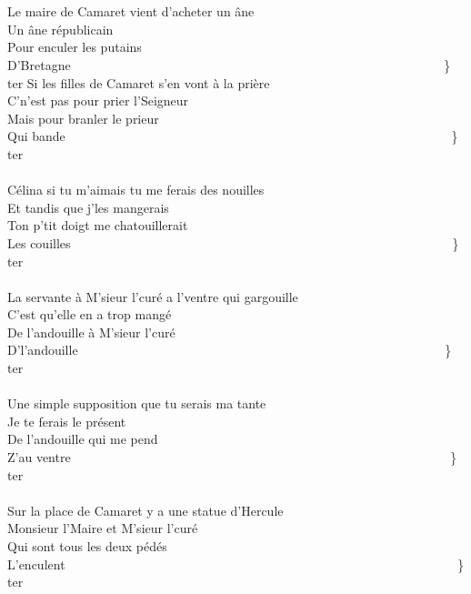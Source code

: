 \\\\Le maire de Camaret vient d'acheter un âne   ~~~~~~~~~~~~~~~\bissimple
\\Un âne républicain
\\Pour enculer les putains
\\D'Bretagne ~~~~~~~~~~~~~~~~~~~~~~~~~~~~~~~~~~~~~~~~~~~~~~~~~~~~~~~~~~\} ter
\breakpage
Si les filles de Camaret s'en vont à la prière   ~~~~~~~~~~~~~~~~\bissimple
\\C'n'est pas pour prier l'Seigneur
\\Mais pour branler le prieur
\\Qui bande ~~~~~~~~~~~~~~~~~~~~~~~~~~~~~~~~~~~~~~~~~~~~~~~~~~~~~~~~~~~~\} ter
\\\\Célina si tu m'aimais tu me ferais des nouilles  ~~~~~~~~~~~~~\bissimple
\\Et tandis que j'les mangerais
\\Ton p'tit doigt me chatouillerait
\\Les couilles~~~~~~~~~~~~~~~~~~~~~~~~~~~~~~~~~~~~~~~~~~~~~~~~~~~~~~~~~~~~\} ter
\\\\La servante à M'sieur l'curé a l'ventre qui gargouille   ~~~~~\bissimple
\\C'est qu'elle en a trop mangé
\\De l'andouille à M'sieur l'curé
\\D'l'andouille ~~~~~~~~~~~~~~~~~~~~~~~~~~~~~~~~~~~~~~~~~~~~~~~~~~~~~~~~~\} ter
\\\\Une simple supposition que tu serais ma tante   ~~~~~~~~~~~~~\bissimple
\\Je te ferais le présent
\\De l'andouille qui me pend
\\Z'au ventre ~~~~~~~~~~~~~~~~~~~~~~~~~~~~~~~~~~~~~~~~~~~~~~~~~~~~~~~~~~~\} ter
\\\\Sur la place de Camaret y a une statue d'Hercule   ~~~~~~~~~\bissimple
\\Monsieur l'Maire et M'sieur l'curé
\\Qui sont tous les deux pédés
\\L'enculent ~~~~~~~~~~~~~~~~~~~~~~~~~~~~~~~~~~~~~~~~~~~~~~~~~~~~~~~~~~~~~\} ter
\\\\
\\
\breakpage
